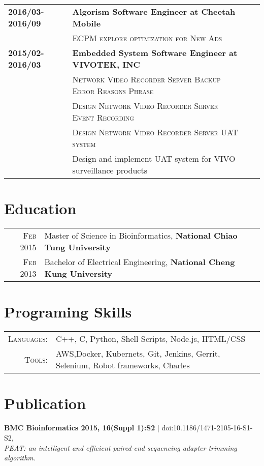 \documentclass[a4paper,pt]{article}
\begin{document}
\begin{itemize}
\begin{tabular}{lp{10cm}p{10cm}p{1cm}}
\textbf{2016/03-2016/09}&\textbf {Algorism Software Engineer at Cheetah Mobile}
\\&\item\textsc{ECPM explore optimization for New Ads}\\

\textbf{2015/02-2016/03}&\textbf {Embedded System Software Engineer at VIVOTEK, INC}
 \\&\item\textsc{Network Video Recorder Server Backup Error Reasons Phrase}
 \\&\item\textsc{Design Network Video Recorder Server Event Recording}
 \\&\item\textsc{Design Network Video Recorder Server UAT system}\\&\footnotesize{\qquad Design and implement UAT system for VIVO surveillance products}
\end{tabular}
\section{Education}
\begin{tabular}{rl}	
\textsc{Feb} 2015& Master of Science in Bioinformatics, \textbf{National Chiao Tung University} \\
\textsc{Feb} 2013& Bachelor of Electrical Engineering, \textbf{National Cheng Kung University}
\end{tabular}

\section{Programing Skills}
\begin{tabular}{rl}
 \textsc{Languages:}&C++, C, Python, Shell Scripts, Node.js, HTML/CSS\\
\textsc{Tools:}&AWS,Docker, Kubernets, Git, Jenkins, Gerrit, Selenium, Robot frameworks, Charles\\
\end{tabular}

\section{Publication}
 \textbf{BMC Bioinformatics 2015, 16(Suppl 1):S2 }| \small{doi:10.1186/1471-2105-16-S1-S2}, \\
 \emph{PEAT: an intelligent and efficient paired-end sequencing adapter trimming algorithm.}
 

\end{itemize}
\end{document}
